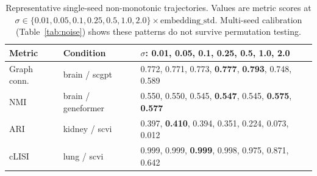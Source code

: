 \documentclass[11pt]{article}
\begin{document}
\begin{table}[h!]
\centering
\caption{Representative single-seed non-monotonic trajectories. Values
are metric scores at $\sigma \in \{0.01, 0.05, 0.1, 0.25, 0.5, 1.0,
2.0\} \times \text{embedding\_std}$. Multi-seed calibration
(Table~\ref{tab:noise}) shows these patterns do not survive permutation
testing.}
\label{tab:app_noise_fail}
\footnotesize
\begin{tabular}{@{}llp{}@{}}
\toprule
Metric & Condition & $\sigma$: 0.01, 0.05, 0.1, 0.25, 0.5, 1.0, 2.0 \\
\midrule
Graph conn. & brain / scgpt & 0.772, 0.771, 0.773, \textbf{0.777}, \textbf{0.793}, 0.748, 0.589 \\
NMI & brain / geneformer & 0.550, 0.550, 0.545, \textbf{0.547}, 0.545, \textbf{0.575}, \textbf{0.577} \\
ARI & kidney / scvi & 0.397, \textbf{0.410}, 0.394, 0.351, 0.224, 0.073, 0.012 \\
cLISI & lung / scvi & 0.999, 0.999, \textbf{0.999}, 0.998, 0.975, 0.871, 0.642 \\
\bottomrule
\end{tabular}
\end{table}






\end{document}
